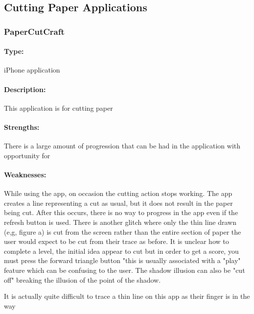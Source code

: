 \documentclass[11pt]{article}
\begin{document}
        \subsection{Cutting Paper Applications}
            \subsubsection{PaperCutCraft}
            
                \paragraph{Type:} iPhone application 
                 
                \paragraph{Description:} This application is for cutting paper

                \paragraph{Strengths:}
                There is a large amount of progression that can be had in the application with opportunity for
                
                \paragraph{Weaknesses:}
                While using the app, on occasion the cutting action stops working. The app creates a line representing a cut as usual, but it does not result in the paper being cut. After this occurs, there is no way to progress in the app even if the refresh button is used. There is another glitch where only the thin line drawn (e,g, figure a) is cut from the screen rather than the entire section of paper the user would expect to be cut from their trace as before. 
                It is unclear how to complete a level, the initial idea appear to cut but in order to get a score, you must press the forward triangle button "this is usually associated with a "play" feature which can be confusing to the user. 
                The shadow illusion can also be "cut off" breaking the illusion of the point of the shadow. 
                
                It is actually quite difficult to trace a thin line on this app as their finger is in the way
                
\end{document}

